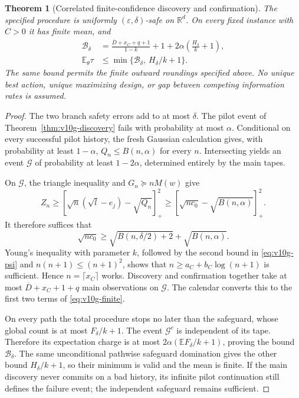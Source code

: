 \documentclass{article}
\theoremstyle{plain}
\newtheorem{theorem}{Theorem}[section]
\theoremstyle{definition}
\begin{document}
\begin{theorem}[Correlated finite-confidence discovery and confirmation]
\label{thm:v10g-expectation}
The specified procedure is uniformly $(\varepsilon,\delta)$-safe on
$\mathbb R^d$.  On every fixed instance with $C>0$ it has finite mean,
and
\begin{equation}
 \begin{aligned}
 \mathcal B_\delta
 &=\frac{\overline D+x_C+q+1}{1-k}+1
       +2\alpha\left(\frac{H_\delta}{k}+1\right),\\
 \mathbb E_\theta\tau
 &\le\min\{\mathcal B_\delta,\ H_\delta/k+1\}.
 \end{aligned}
 \label{eq:v10g-finite}
\end{equation}
The same bound permits the finite outward roundings specified above.
No unique best action, unique maximizing design, or gap between competing
information rates is assumed.
\end{theorem}
\begin{proof}
The two branch safety errors add to at most $\delta$.
The pilot event of Theorem~\ref{thm:v10g-discovery} fails with probability
at most $\alpha$.  Conditional on every successful pilot history,
the fresh Gaussian calculation gives, with probability at least
$1-\alpha$, $Q_n\le B(n,\alpha)$ for every $n$.
Intersecting yields an event $\mathcal G$ of probability at least
$1-2\alpha$, determined entirely by the main tapes.

On $\mathcal G$, the triangle inequality and $G_n\succeq nM(w)$ give
\[
 Z_n\ge\left[\sqrt n(\sqrt l-e_j)-\sqrt{Q_n}\right]_+^2
     \ge\left[\sqrt{nc_0}-\sqrt{B(n,\alpha)}\right]_+^2.
\]
It therefore suffices that
\begin{equation}
 \sqrt{nc_0}\ge
       \sqrt{B(n,\delta/2)+2}+\sqrt{B(n,\alpha)}.
 \label{eq:v10g-crossing}
\end{equation}
Young's inequality with parameter $k$, followed by the second bound in
\eqref{eq:v10g-psi} and $n(n+1)\le(n+1)^2$, shows that
$n\ge a_C+b_C\log(n+1)$ is sufficient.  Hence
$n=\lceil x_C\rceil$ works.  Discovery and confirmation together take
at most $\overline D+x_C+1+q$ main observations on $\mathcal G$.
The calendar converts this to the first two terms of
\eqref{eq:v10g-finite}.

On every path the total procedure stops no later than the safeguard,
whose global count is at most $F_\delta/k+1$.
The event $\mathcal G^c$ is independent of its tape.  Therefore its
expectation charge is at most
$2\alpha(\mathbb EF_\delta/k+1)$, proving the bound
$\mathcal B_\delta$.  The same unconditional pathwise safeguard
domination gives the other bound $H_\delta/k+1$, so their minimum
is valid and the mean is finite.
If the main discovery never commits on a bad history, its infinite
pilot continuation still defines the failure event; the independent
safeguard remains sufficient.
\end{proof}
\end{document}
